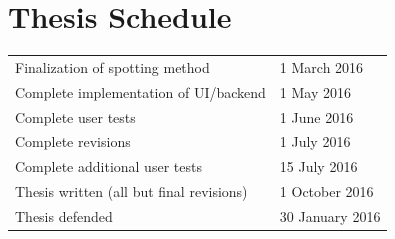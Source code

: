 \documentclass[ms]{byuprop}
\begin{document}
\section{Thesis Schedule}
\begin{table}[H]
\centering
\begin{tabular}{ll}
Finalization of spotting method          & 1 March 2016 \\
Complete implementation of UI/backend    & 1 May 2016    \\
Complete user tests                      & 1 June 2016   \\
Complete revisions                       & 1 July 2016      \\
Complete additional user tests           & 15 July 2016     \\
Thesis written (all but final revisions) & 1 October 2016     \\
Thesis defended                          & 30 January 2016    
\end{tabular}
\end{table}




\end{document}
